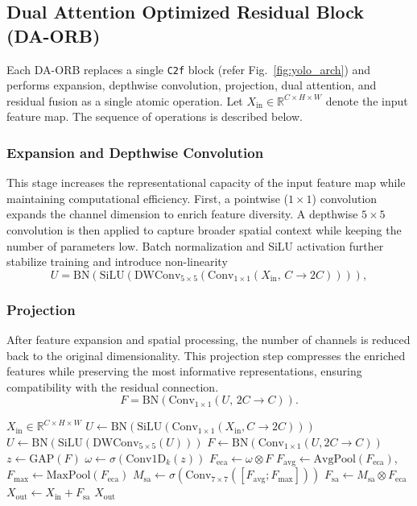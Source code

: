 \documentclass[journal,twoside,web]{ieeecolor}
\begin{document}
\subsection{Dual Attention Optimized Residual Block (DA-ORB)}
Each DA-ORB replaces a single \texttt{C2f} block (refer Fig.~\ref{fig:yolo_arch}) and performs expansion, depthwise convolution, projection, dual attention, and residual fusion as a single atomic operation. Let $X_{\text{in}}\in\mathbb{R}^{C\times H\times W}$ denote the input feature map. The sequence of operations is described below.

\subsubsection{Expansion and Depthwise Convolution}
This stage increases the representational capacity of the input feature map while maintaining computational efficiency. First, a pointwise ($1\times1$) convolution expands the channel dimension to enrich feature diversity. A depthwise $5\times5$ convolution is then applied to capture broader spatial context while keeping the number of parameters low. Batch normalization and SiLU activation further stabilize training and introduce non-linearity
$$U = \mathrm{BN}\!\left(\mathrm{SiLU}\!\left(\mathrm{DWConv}_{5\times5}\!\left(\mathrm{Conv}_{1\times1}(X_{\text{in}},\,C\!\rightarrow\!2C)\right)\right)\right),
$$

\subsubsection{Projection}

After feature expansion and spatial processing, the number of channels is reduced back to the original dimensionality. This projection step compresses the enriched features while preserving the most informative representations, ensuring compatibility with the residual connection.
$$
F = \mathrm{BN}\!\left(\mathrm{Conv}_{1\times1}(U,\,2C\!\rightarrow\!C)\right).
$$

\begin{algorithm}[t]
\caption{Dual Attention Optimized Residual Block}
\label{alg:daorb}
\begin{algorithmic}[1]
\REQUIRE $X_{\text{in}}\in\mathbb{R}^{C\times H\times W}$
\STATE $U \leftarrow \mathrm{BN}(\mathrm{SiLU}(\mathrm{Conv}_{1\times1}(X_{\text{in}},C\!\rightarrow\!2C)))$
\STATE $U \leftarrow \mathrm{BN}(\mathrm{SiLU}(\mathrm{DWConv}_{5\times5}(U)))$
\STATE $F \leftarrow \mathrm{BN}(\mathrm{Conv}_{1\times1}(U,2C\!\rightarrow\!C))$
\STATE $z \leftarrow \mathrm{GAP}(F)$
\STATE $\omega \leftarrow \sigma(\mathrm{Conv1D}_k(z))$
\STATE $F_{\text{eca}} \leftarrow \omega \otimes F$
\STATE $F_{\text{avg}} \leftarrow \mathrm{AvgPool}(F_{\text{eca}})$, \quad $F_{\text{max}} \leftarrow \mathrm{MaxPool}(F_{\text{eca}})$
\STATE $M_{\text{sa}} \leftarrow \sigma(\mathrm{Conv}_{7\times7}([F_{\text{avg}};F_{\text{max}}]))$
\STATE $F_{\text{sa}} \leftarrow M_{\text{sa}} \otimes F_{\text{eca}}$
\STATE $X_{\text{out}} \leftarrow X_{\text{in}} + F_{\text{sa}}$
\RETURN $X_{\text{out}}$
\end{algorithmic}
\end{algorithm}
\end{document}
